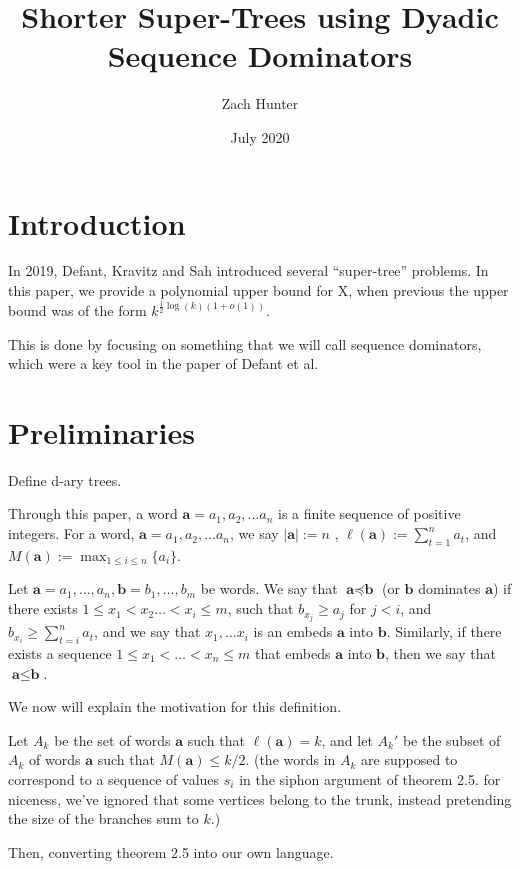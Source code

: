 \documentclass{article}
\title{Shorter Super-Trees using Dyadic Sequence Dominators}
\author{Zach Hunter}
\date{July 2020}
\newcommand{\hide}[1]{}
\begin{document}
\maketitle
\section{Introduction}

In 2019, Defant, Kravitz and Sah introduced several ``super-tree'' problems. \hide{arXiv:1908.03197v2} In this paper, we provide a polynomial upper bound for X, when previous the upper bound was of the form $k^{\frac{1}{2}\log(k)(1+o(1))}$.

This is done by focusing on something that we will call sequence dominators, which were a key tool in the paper of Defant et al.


\section{Preliminaries}

Define d-ary trees.

Through this paper, a word $\textbf{a} = a_1,a_2,\dots a_n$ is a finite sequence of positive integers. For a word, $\textbf{a} = a_1,a_2,\dots a_n$, we say $|\textbf{a}| := n$ , $\ell(\textbf{a}) := \sum_{t=1}^n a_t$, and $M(\textbf{a}):= \max_{1 \le i \le n}\{a_i\}$.

Let $\textbf{a} =a_1,\dots,a_n,\textbf{b} = b_1,\dots,b_m$ be words. We say that $\textbf{a}\preceq \textbf{b}$ (or $\textbf{b}$ dominates $\textbf{a}$) if there exists $1 \le x_1<x_2\dots <x_i\le m$, such that $b_{x_j} \ge a_j$ for $j < i$, and $b_{x_i} \ge \sum_{t=i}^n a_t$, and we say that $x_1,\dots x_i$ is an embeds $\textbf{a}$ into $\textbf{b}$. Similarly, if there exists  a sequence $1\le x_1 < \dots <x_n\le m$ that embeds $\textbf{a}$ into $\textbf{b}$, then we say that $\textbf{a}\le \textbf{b}$.


We now will explain the motivation for this definition.

Let $A_k$ be the set of words $\textbf{a}$ such that $\ell(\textbf{a})=k$, and let $A_k'$ be the subset of $A_k$ of words $\textbf{a}$ such that $M(\textbf{a}) \le k/2$. (the words in $A_k$ are supposed to correspond to a sequence of values $s_i$ in the siphon argument of theorem 2.5. for niceness, we've ignored that some vertices belong to the trunk, instead pretending the size of the branches sum to $k$.)

Then, converting theorem 2.5 into our own language. 
\end{document}
